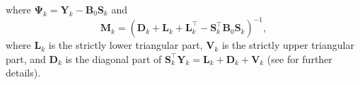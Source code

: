 where  $\mathbf{\Psi}_{k} = \mathbf{Y}_{k} -  \mathbf{B}_0 \mathbf{S}_{k}$ and 
$$
        \mathbf{M}_{k} = (\mathbf{D}_{k} \!+\! \mathbf{L}_{k} \!+\! \mathbf{L}_{k}^{\top} \!-\! \mathbf{S}_{k}^{\top}\!\mathbf{B}_0\mathbf{S}_{k})^{-1}\!,
$$
where $\mathbf{L}_{k}$ is the strictly lower triangular part, $\mathbf{V}_{k}$ is the strictly
upper triangular part, and $\mathbf{D}_{k}$ is the diagonal part of 
$
	\mathbf{S}_{k}^{\top}\mathbf{Y}_{k} =   \mathbf{L}_{k} + \mathbf{D}_{k} + \mathbf{V}_{k}
$
(see \citet{ByrNS94} for further details).  


